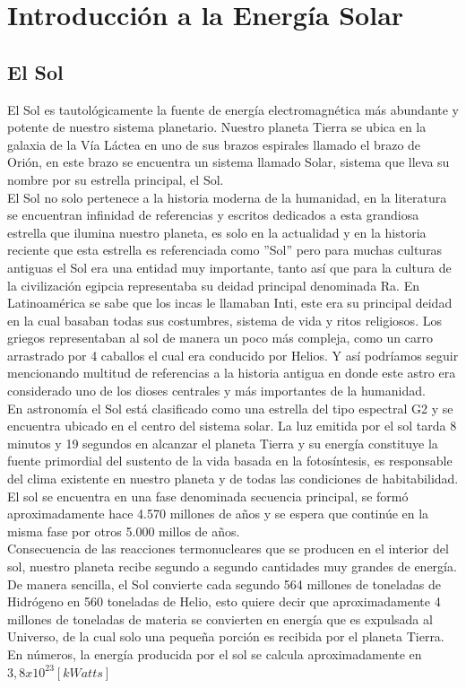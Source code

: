 \chapter{Introducción a la Energía Solar}
\label{solar}

\section{El Sol}
\label{elSol}
El Sol es tautológicamente la fuente de energía electromagnética más abundante y potente de nuestro sistema planetario. Nuestro planeta Tierra se ubica en la galaxia de la Vía Láctea en uno de sus brazos espirales llamado el brazo de Orión, en este brazo se encuentra un sistema llamado Solar\cite{solar:1}, sistema que lleva su nombre por su estrella principal, el Sol.\\

El Sol no solo pertenece a la historia moderna de la humanidad, en la literatura se encuentran infinidad de referencias y escritos dedicados a esta grandiosa estrella que ilumina nuestro planeta, es solo en la actualidad y en la historia reciente que esta estrella es referenciada como ''Sol'' pero para muchas culturas antiguas el Sol era una entidad muy importante, tanto así que para la cultura de la civilización egipcia representaba su deidad principal denominada Ra. En Latinoamérica se sabe que los incas le llamaban Inti, este era su principal deidad en la cual basaban todas sus costumbres, sistema de vida y ritos religiosos. Los griegos representaban al sol de manera un poco más compleja, como un carro arrastrado por 4 caballos el cual era conducido por Helios. Y así podríamos seguir mencionando multitud de referencias a la historia antigua en donde este astro era considerado uno de los dioses centrales y más importantes de la humanidad.\\ 

En astronomía el Sol está clasificado como una estrella del tipo espectral G2 y se encuentra ubicado en el centro del sistema solar. La luz emitida por el sol tarda 8 minutos y 19 segundos\cite{solar:2} en alcanzar el planeta Tierra y su energía constituye la fuente primordial del sustento de la vida basada en la fotosíntesis, es responsable del clima existente en nuestro planeta y de todas las condiciones de habitabilidad.\\

El sol se encuentra en una fase denominada secuencia principal, se formó aproximadamente hace 4.570 millones de años y se espera que continúe en la misma fase por otros 5.000 millos de años\cite{solar:4}.\\
Consecuencia de las reacciones termonucleares que se producen en el interior del sol, nuestro planeta recibe segundo a segundo cantidades muy grandes de energía. De manera sencilla, el Sol convierte cada segundo 564 millones de toneladas de Hidrógeno en 560 toneladas de Helio, esto quiere decir que aproximadamente 4 millones de toneladas de materia se convierten en energía que es expulsada al Universo, de la cual solo una pequeña porción es recibida por el planeta Tierra. En números, la energía producida por el sol se calcula aproximadamente en $3,8 x {10}^{23} [kWatts]$\cite{solar:3}\\

